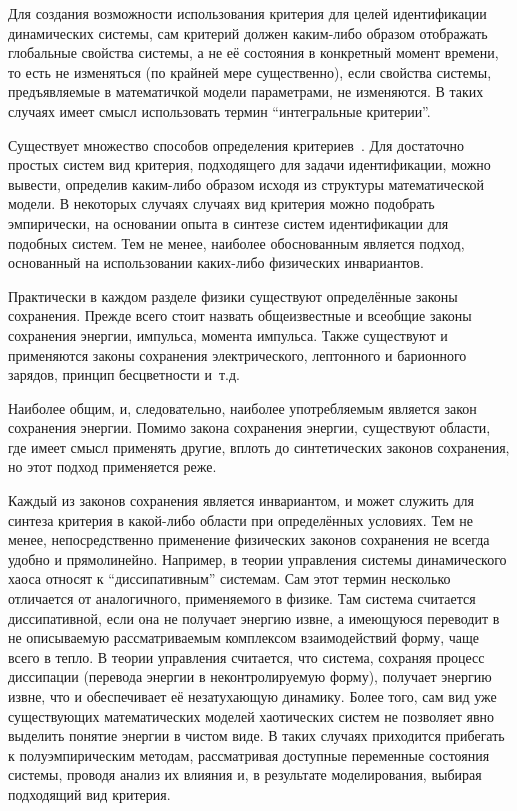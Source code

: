 Для создания возможности использования критерия
для целей идентификации динамических системы,
сам критерий должен каким-либо образом отображать
глобальные свойства системы, а не её состояния в конкретный момент времени,
то есть не изменяться (по крайней мере существенно),
если свойства системы, предъявляемые в математичкой модели параметрами,
не изменяются. В таких случаях имеет смысл использовать
термин ``интегральные критерии''.



Существует множество способов определения
критериев~\cite{atu_asau11,atu_asau12,atu_asau14,atu_khar_autodor25,atu_asau18,atu_st79,atu_apir2013}.
Для достаточно простых систем вид критерия,
подходящего для задачи идентификации, можно вывести,
определив каким-либо образом исходя из структуры
математической модели.
В некоторых случаях случаях вид критерия можно подобрать эмпирически,
на основании опыта в синтезе систем идентификации для подобных
систем. Тем не менее, наиболее обоснованным
является подход, основанный на использовании
каких-либо физических инвариантов.

Практически в каждом разделе физики существуют
определённые законы сохранения.
Прежде всего стоит назвать общеизвестные и всеобщие
законы сохранения энергии, импульса, момента импульса.
Также существуют и применяются законы сохранения
электрического, лептонного и барионного зарядов,
принцип бесцветности и~т.д.

Наиболее общим, и, следовательно, наиболее употребляемым является
закон сохранения энергии.
Помимо закона сохранения энергии, существуют области,
где имеет смысл применять другие, вплоть до синтетических
законов сохранения, но этот подход
применяется реже.

Каждый из законов сохранения является инвариантом,
и может служить для синтеза критерия в какой-либо области
при определённых условиях.
Тем не менее, непосредственно применение
физических законов сохранения не всегда
удобно и прямолинейно.
Например, в теории управления системы динамического
хаоса относят к ``диссипативным'' системам.
Сам этот термин несколько отличается от аналогичного,
применяемого в физике.
Там система считается диссипативной, если она не
получает энергию извне, а имеющуюся переводит
в не описываемую рассматриваемым комплексом взаимодействий
форму, чаще всего в тепло. 
В теории управления
считается, что система, сохраняя процесс диссипации
(перевода энергии в неконтролируемую форму),
получает энергию извне, что и обеспечивает её незатухающую
динамику. 
Более того, сам вид уже существующих
математических моделей хаотических систем не позволяет
явно выделить понятие энергии в чистом виде.
В таких случаях
приходится прибегать к полуэмпирическим методам,
рассматривая доступные переменные состояния системы,
проводя анализ их влияния и, в результате моделирования,
выбирая подходящий вид критерия.


